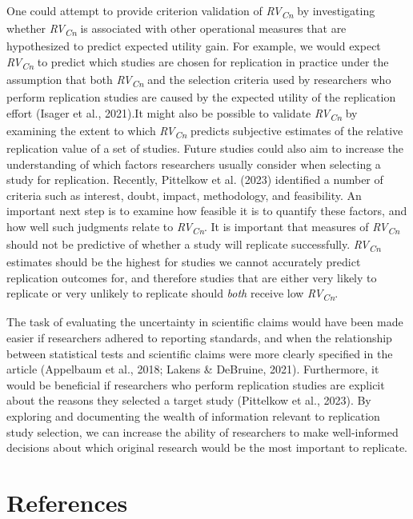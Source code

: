 \documentclass[
  man,floatsintext]{apa6}
\begin{document}
One could attempt to provide criterion validation of \emph{RV\textsubscript{Cn}} by investigating whether \emph{RV\textsubscript{Cn}} is associated with other operational measures that are hypothesized to predict expected utility gain. For example, we would expect \emph{RV\textsubscript{Cn}} to predict which studies are chosen for replication in practice under the assumption that both \emph{RV\textsubscript{Cn}} and the selection criteria used by researchers who perform replication studies are caused by the expected utility of the replication effort (Isager et al., 2021).It might also be possible to validate \emph{RV\textsubscript{Cn}} by examining the extent to which \emph{RV\textsubscript{Cn}} predicts subjective estimates of the relative replication value of a set of studies. Future studies could also aim to increase the understanding of which factors researchers usually consider when selecting a study for replication. Recently, Pittelkow et al. (2023) identified a number of criteria such as interest, doubt, impact, methodology, and feasibility. An important next step is to examine how feasible it is to quantify these factors, and how well such judgments relate to \emph{RV\textsubscript{Cn}}. It is important that measures of \emph{RV\textsubscript{Cn}} should not be predictive of whether a study will replicate successfully. \emph{RV\textsubscript{Cn}} estimates should be the highest for studies we cannot accurately predict replication outcomes for, and therefore studies that are either very likely to replicate or very unlikely to replicate should \emph{both} receive low \emph{RV\textsubscript{Cn}}.

The task of evaluating the uncertainty in scientific claims would have been made easier if researchers adhered to reporting standards, and when the relationship between statistical tests and scientific claims were more clearly specified in the article (Appelbaum et al., 2018; Lakens \& DeBruine, 2021). Furthermore, it would be beneficial if researchers who perform replication studies are explicit about the reasons they selected a target study (Pittelkow et al., 2023). By exploring and documenting the wealth of information relevant to replication study selection, we can increase the ability of researchers to make well-informed decisions about which original research would be the most important to replicate.

\hypertarget{references}{%
\section*{References}\label{references}}
\end{document}
